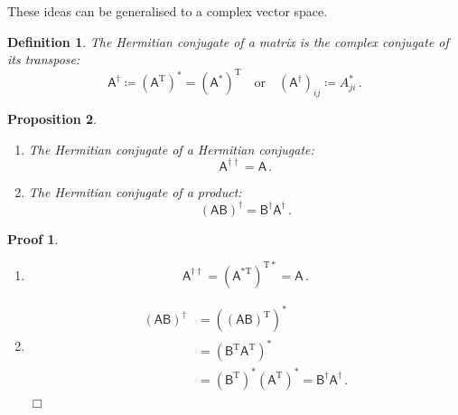 \documentclass{article}
\theoremstyle{plain}\theoremheaderfont{\normalfont\itshape}\theorembodyfont{\rmfamily}\theoremseparator{.}\newtheorem*{rem}{Remark}\newtheorem*{ex}{Example}\newtheorem*{proof}{Proof}\newtheorem*{altp}{Alternative proof}
\theoremstyle{plain}\theoremheaderfont{\normalfont\bfseries}\theorembodyfont{\rmfamily}\theoremseparator{.}\newtheorem{thm}{Theorem}[section]\newtheorem{lem}[thm]{Lemma}\newtheorem{prop}[thm]{Proposition}\newtheorem*{cor}{Corollary}\newtheorem{defn}[thm]{Definition}\newtheorem{clm}[thm]{Claim}\newtheorem{clminproof}{Claim}
\theoremstyle{break}\theoremheaderfont{\normalfont\itshape}\theorembodyfont{\rmfamily}\theoremseparator{.\medskip}\newtheorem*{proofskip}{Proof}\newtheorem*{exs}{Examples}\newtheorem*{rems}{Remarks}
\theoremstyle{break}\theoremheaderfont{\normalfont\bfseries}\theorembodyfont{\rmfamily}\theoremseparator{.\medskip}\newtheorem{lemskip}[thm]{Lemma}\newtheorem{defnskip}[thm]{Definition}\newtheorem{propskip}[thm]{Proposition}\newtheorem{thmskip}[thm]{Theorem}
\numberwithin{equation}{section}
\newcommand{\qed}{\hfill\ensuremath{\Box}}
\newcommand{\tp}{^\mathrm{T}}
\begin{document}
	These ideas can be generalised to a complex vector space.
	
	\begin{defn}
		The \textit{Hermitian conjugate} of a matrix is the complex conjugate of its transpose:
		\[\mathsf{A}^\dagger\coloneqq(\mathsf{A}^{\mathrm{T}})^*=(\mathsf{A}^*)^{\mathrm{T}}\quad\text{or}\quad(\mathsf{A}^\dagger)_{ij}\coloneqq A^*_{ji}\,.\]
	\end{defn}
	\begin{propskip}
		\begin{enumerate}[topsep=0pt]
			\item[(i)] The Hermitian conjugate of a Hermitian conjugate:
			\[\mathsf{A}^{\dagger\dagger}=\mathsf{A}\,.\]
			\item[(ii)] The Hermitian conjugate of a product:
			\[(\mathsf{AB})^\dagger=\mathsf{B^\dagger A^\dagger}\,.\]
		\end{enumerate}
	\end{propskip}
	\begin{proofskip}
		\begin{enumerate}[topsep=0pt]
			\item[(i)]
			\[\mathsf{A}^{\dagger\dagger}=(\mathsf{A}^{*\mathrm{T}})^{\mathrm{T}*}=\mathsf{A}\,.\]
			\item[(ii)]
			\begin{align*}
				(\mathsf{AB})^\dagger&=((\mathsf{AB})\tp)^*\\
				&=(\mathsf{B\tp A\tp})^*\\
				&=(\mathsf{B}\tp)^*(\mathsf{A}\tp)^*=\mathsf{B^\dagger A^\dagger}\,.
			\end{align*}\qed
		\end{enumerate}
	\end{proofskip}
\end{document}
